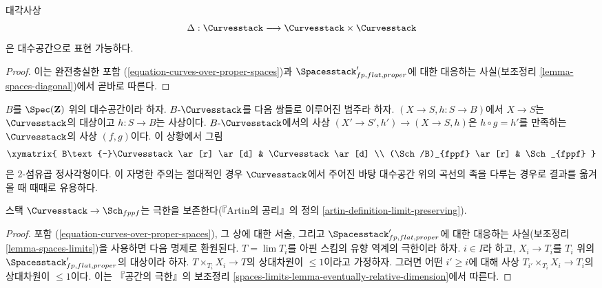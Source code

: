 \begin{lemma}
\label{lemma-curves-diagonal}
대각사상
$$
\Delta : \Curvesstack \longrightarrow \Curvesstack \times \Curvesstack
$$
은 대수공간으로 표현 가능하다.
\end{lemma}

\begin{proof}
이는 완전충실한 포함 (\ref{equation-curves-over-proper-spaces})과
$\Spacesstack'_{fp, flat, proper}$에 대한 대응하는 사실(보조정리
\ref{lemma-spaces-diagonal})에서 곧바로 따른다.
\end{proof}

\begin{remark}
\label{remark-curves-base-change}
$B$를 $\Spec(\mathbf{Z})$ 위의 대수공간이라 하자.
$B\text{-}\Curvesstack$를 다음 쌍들로 이루어진 범주라 하자.
$(X \to S, h : S \to B)$에서 $X \to S$는 $\Curvesstack$의 대상이고
$h : S \to B$는 사상이다. $B\text{-}\Curvesstack$에서의 사상
$(X' \to S', h') \to (X \to S, h)$은 $h \circ g = h'$를 만족하는
$\Curvesstack$의 사상 $(f, g)$이다. 이 상황에서 그림
$$
\xymatrix{
B\text{-}\Curvesstack \ar[r] \ar[d] & \Curvesstack \ar[d] \\
(\Sch/B)_{fppf} \ar[r] & \Sch_{fppf}
}
$$
은 $2$-섬유곱 정사각형이다. 이 자명한 주의는 절대적인 경우
$\Curvesstack$에서 주어진 바탕 대수공간 위의 곡선의 족을 다루는 경우로
결과를 옮겨 올 때 때때로 유용하다.
\end{remark}

\begin{lemma}
\label{lemma-curves-limits}
스택 $\Curvesstack \to \Sch_{fppf}$는 극한을 보존한다(『Artin의 공리』의
정의 \ref{artin-definition-limit-preserving}).
\end{lemma}

\begin{proof}
포함 (\ref{equation-curves-over-proper-spaces}), 그 상에 대한 서술, 그리고
$\Spacesstack'_{fp, flat, proper}$에 대한 대응하는 사실(보조정리
\ref{lemma-spaces-limits})을 사용하면 다음 명제로 환원된다. $T = \lim T_i$를
아핀 스킴의 유향 역계의 극한이라 하자. $i \in I$라 하고,
$X_i \to T_i$를 $T_i$ 위의 $\Spacesstack'_{fp, flat, proper}$의 대상이라 하자.
$T \times_{T_i} X_i \to T$의 상대차원이 $\leq 1$이라고 가정하자. 그러면
어떤 $i' \geq i$에 대해 사상
$T_{i'} \times_{T_i} X_i \to T_i$의 상대차원이 $\leq 1$이다. 이는
『공간의 극한』의 보조정리
\ref{spaces-limits-lemma-eventually-relative-dimension}에서 따른다.
\end{proof}

